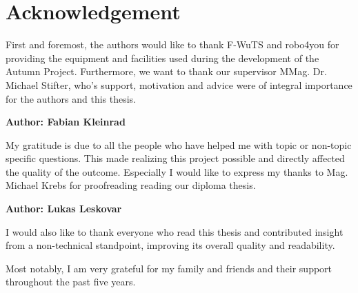 \chapter{Acknowledgement}

First and foremost, the authors would like to thank F-WuTS and robo4you for providing the equipment and facilities used during the development of the Autumn Project. Furthermore, we want to thank our supervisor MMag. Dr. Michael Stifter, who's support, motivation and advice were of integral importance for the authors and this thesis.\linebreak

\textbf{Author: Fabian Kleinrad}

My gratitude is due to all the people who have helped me with topic or non-topic specific questions. This made realizing this project possible and directly affected the quality of the outcome. 
Especially I would like to express my thanks to Mag. Michael Krebs for proofreading reading our diploma thesis.

\textbf{Author: Lukas Leskovar}


I would also like to thank everyone who read this thesis and contributed insight from a non-technical standpoint, improving its overall quality and readability. 

Most notably, I am very grateful for my family and friends and their support throughout the past five years. 
